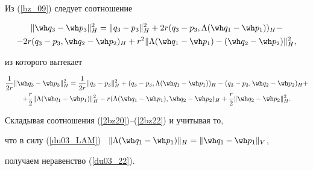\begin{pf}
\begin{equation}
\label{2bz21}


\end{equation}





Из (\ref{bz_09}) следует соотношение


\begin{multline*}


 \| {\wh q_3-\wh p_3} \|_H^2=\| {q_3-p_3} \|_H^2 +


2 r (q_3-p_3, \Lambda (\wh q_1-\wh p_1))_H-\\


%


- 2 r (q_3-p_3, \wh q_2-\wh p_2)_H+


r^2 \| {\Lambda (\wh q_1-\wh p_1)-(\wh q_2-\wh p_2)} \|_H^2, 


\end{multline*}


из которого вытекает


\begin{multline}


\frac {1} {2 r} \| {\wh q_3-\wh p_3} \|_H^2=


\frac {1} {2 r} \| {q_3-p_3} \|_H^2 +


 (q_3-p_3, \Lambda (\wh q_1-\wh p_1))_H-


 (q_3-p_3, \wh q_2-\wh p_2)_H+\\


%


+


\frac {r} {2} \| {\Lambda (\wh q_1-\wh p_1)} \|_H^2


- r (\Lambda (\wh q_1-\wh p_1), \wh q_2-\wh p_2)_H+


\frac {r} {2} \| {\wh q_2-\wh p_2} \|_H^2. 


\label{2bz22}


\end{multline}





Складывая соотношения (\ref{2bz20})--(\ref{2bz22}) и учитывая то, 


что в силу (\ref{du03_LAM}) \ $ \| {\Lambda (\wh q_1-\wh p_1)} \|_H=


\| {\wh q_1-\wh p_1} \|_V $,


получаем неравенство (\ref{du03_22}).


\end{pf}





